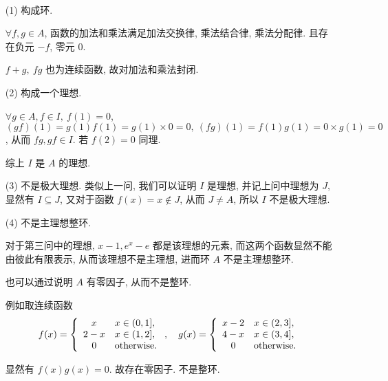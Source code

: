 \begin{solution}\
	\begin{itemize}
		\item[(1)] 构成环.
		
		$\forall f,g\in A$, 函数的加法和乘法满足加法交换律, 乘法结合律, 乘法分配律.
		且存在负元 $-f$, 零元 $0$.
		
		$f+g,\ fg$ 也为连续函数, 故对加法和乘法封闭.
		
		\item[(2)] 构成一个理想.
		
		$\forall g\in A,f\in I,\ f(1)=0$, $(gf)(1)=g(1)f(1)=g(1)\times 0=0,\ (fg)(1)=f(1)g(1)=0\times g(1)=0$, 从而 $fg,gf\in I$. 若 $f(2)=0$ 同理.
		
		综上 $I$ 是 $A$ 的理想.
		
		\item[(3)] 不是极大理想. 类似上一问, 我们可以证明 $I$ 是理想, 并记上问中理想为 $J$, 显然有 $I\subseteq J$, 又对于函数 $f(x)=x\notin J$, 从而 $J\neq A$, 所以 $I$ 不是极大理想.
		
		\item[(4)] 不是主理想整环.
		
		对于第三问中的理想, $x-1,e^x-e$ 都是该理想的元素, 而这两个函数显然不能由彼此有限表示, 从而该理想不是主理想, 进而环 $A$ 不是主理想整环.
		
		也可以通过说明 $A$ 有零因子, 从而不是整环.
		
		例如取连续函数 
		$$f(x)=\left\{\begin{array}{cl}
			x & x\in (0,1], \\
			2-x & x\in (1,2], \\
			0 & \text {otherwise}.
		\end{array}\right.,\quad g(x)=\left\{
			\begin{array}{cl}
				x-2 & x\in (2,3], \\
				4-x & x\in (3,4], \\
				0 & \text {otherwise}.
			\end{array}
		\right.$$
		
		显然有 $f(x)g(x)=0$. 故存在零因子. 不是整环.
	\end{itemize}
\end{solution}

\problem[题目 4]

